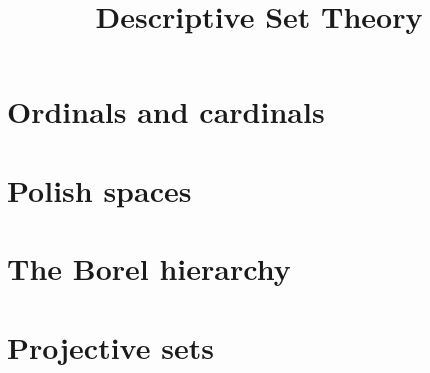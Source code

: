\documentclass[a4paper,11pt,oneside]{book}
\title{\Huge \textbf{Descriptive Set Theory}}
\author{\textsc{}}
\begin{document}
\sloppy

\frontmatter
\maketitle

\tableofcontents

\mainmatter

% 
% 



\section{Ordinals and cardinals}



\section{Polish spaces}







\section{The Borel hierarchy}















\section{Projective sets}




\end{document}
